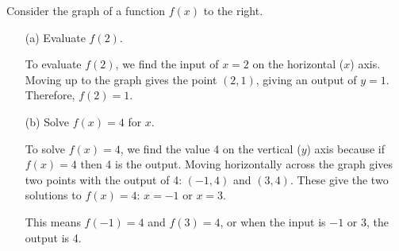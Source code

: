 \begin{minipage}{0.65\textwidth}
\begin{example}
Consider the graph of a function $f(x)$ to the right.

    \begin{itemize}

        \item[(a)] Evaluate $f(2)$.

        \begin{solution} To evaluate $f(2)$, we find the input of $x=2$ on the horizontal ($x$) axis. Moving up to the graph gives the point $(2, 1)$, giving an output of $y=1$. Therefore, $f(2) = 1$.
\end{solution}
        \item[(b)] Solve $f(x) = 4$ for $x$.

        \begin{solution} To solve $f(x) = 4$, we find the value 4 on the vertical ($y$) axis because if $f(x) = 4$ then 4 is the output. Moving horizontally across the graph gives two points with the output of 4: $(-1,4)$ and $(3,4)$. These give the two solutions to $f(x) = 4$: $x = -1$ or $x = 3$.

        This means $f(-1)=4$ and $f(3)=4$, or when the input is $-1$ or 3, the output is 4.
        \end{solution}
    \end{itemize}

\end{example}
 \end{minipage}
